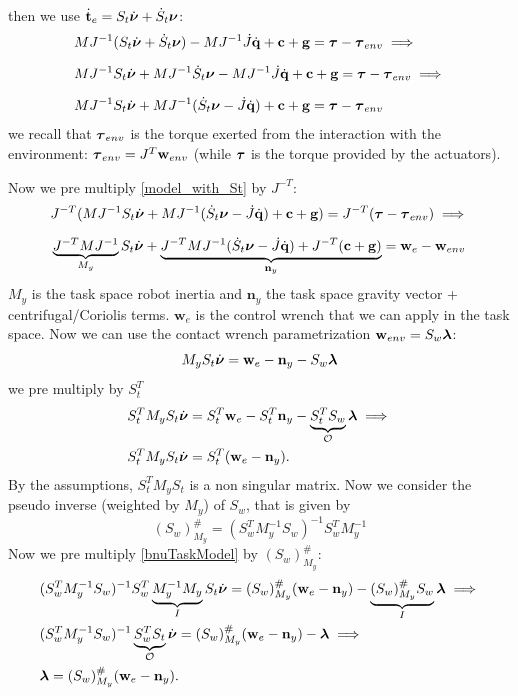 \documentclass[10pt, a4paper]{report}
\begin{document}
then we use $\dot{\mathbf t}_e=S_t\dot{{\boldsymbol{\nu}}}+\dot S_t{\boldsymbol{\nu}}$:\begin{align}
    &MJ^{-1}(S_t\dot{{\boldsymbol{\nu}}}+\dot S_t{\boldsymbol{\nu}})-MJ^{-1}\dot J{\dot{\mathbf q}}+\mathbf c+\mathbf g={\boldsymbol{\tau}}-{\boldsymbol{\tau}}_{env}\implies\\[1.5ex]
    &MJ^{-1}S_t\dot{{\boldsymbol{\nu}}}+MJ^{-1}\dot S_t{\boldsymbol{\nu}}-MJ^{-1}\dot J{\dot{\mathbf q}}+\mathbf c+\mathbf g={\boldsymbol{\tau}}-{\boldsymbol{\tau}}_{env}\implies\\[1.5ex]
     &MJ^{-1}S_t\dot{{\boldsymbol{\nu}}}+MJ^{-1}(\dot S_t{\boldsymbol{\nu}}-\dot J{\dot{\mathbf q}})+\mathbf c+\mathbf g={\boldsymbol{\tau}}-{\boldsymbol{\tau}}_{env}\label{model_with_St}
\end{align}
we recall that ${\boldsymbol{\tau}}_{env}$ is the torque exerted from the interaction with the environment: ${\boldsymbol{\tau}}_{env}=J^T\mathbf w_{env}$ (while ${\boldsymbol{\tau}}$ is the torque provided by the actuators). 

Now we pre multiply \eqref{model_with_St} by $J^{-T}$:\begin{align}
     &J^{-T}(MJ^{-1}S_t\dot{{\boldsymbol{\nu}}}+MJ^{-1}(\dot S_t{\boldsymbol{\nu}}-\dot J{\dot{\mathbf q}})+\mathbf c+\mathbf g)=J^{-T}({\boldsymbol{\tau}}-{\boldsymbol{\tau}}_{env})\implies\\[1.5ex]
     &\underbrace{J^{-T}MJ^{-1}}_{M_y}S_t\dot{{\boldsymbol{\nu}}}+
     \underbrace{J^{-T}MJ^{-1}(
        \dot S_t{\boldsymbol{\nu}}-\dot J{\dot{\mathbf q}}
     )+J^{-T}(\mathbf c+\mathbf g)}_{\mathbf n_y}=\mathbf w_e-\mathbf w_{env}
\end{align}
$M_y$ is the task space robot inertia and $\mathbf n_y$ the task space gravity vector + centrifugal/Coriolis terms. $\mathbf w_e$ is the control wrench that we can apply in the task space. Now we can use the contact wrench parametrization $\mathbf w_{env}=S_w{\boldsymbol{\lambda}}$:\begin{equation}
    M_yS_t\dot{{\boldsymbol{\nu}}}=\mathbf w_e-\mathbf n_y-S_w{\boldsymbol{\lambda}}\label{bnuTaskModel}
\end{equation}
we pre multiply by $S_t^T$
\begin{align}
    &S_t^TM_yS_t\dot{{\boldsymbol{\nu}}}=S_t^T\mathbf w_e-S_t^T\mathbf n_y-\underbrace{S_t^TS_w}_{\mathcal O}{\boldsymbol{\lambda}}\implies\\ 
    &S_t^TM_yS_t\dot{{\boldsymbol{\nu}}}=S_t^T(\mathbf w_e-\mathbf n_y).
\end{align}
By the assumptions, $S_t^TM_yS_t$ is a non singular matrix. Now we consider the pseudo inverse (weighted by $M_y$) of $S_w$, that is given by\begin{equation}
    (S_w)_{M_y}^\#=(S_w^TM_y^{-1}S_w)^{-1}S_w^TM_y^{-1}
\end{equation}
Now we pre multiply \eqref{bnuTaskModel} by $(S_w)_{M_y}^\#$:\begin{align}
   &(S_w^TM_y^{-1}S_w)^{-1}S_w^T\underbrace{M_y^{-1} M_y}_{I}S_t\dot{{\boldsymbol{\nu}}}=(S_w)_{M_y}^\# (\mathbf w_e-\mathbf n_y)-\underbrace{(S_w)_{M_y}^\#S_w}_{I}{\boldsymbol{\lambda}}\implies\\
   &(S_w^TM_y^{-1}S_w)^{-1}\underbrace{S_w^TS_t}_{\mathcal O}\dot{{\boldsymbol{\nu}}}=
   (S_w)_{M_y}^\# (\mathbf w_e-\mathbf n_y)-{\boldsymbol{\lambda}}\implies\\
   &{\boldsymbol{\lambda}}=(S_w)_{M_y}^\# (\mathbf w_e-\mathbf n_y).
\end{align}
\end{document}
